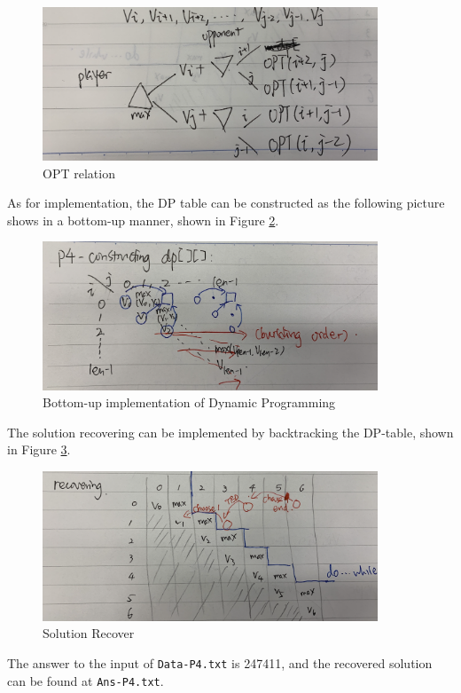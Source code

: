 \begin{exercise}[]
\begin{solution}
  \begin{figure}
    \centering
    \includegraphics[width=10cm]{img/ex4-1.png}
    \caption{OPT relation\label{fig:ex1}}
  \end{figure}


  As for implementation, the DP table can be constructed as the following picture shows in a bottom-up manner, shown in Figure \ref{fig:ex2}.
  
  \begin{figure}
    \centering
    \includegraphics[width=10cm]{img/ex4-2.png}
    \caption{Bottom-up implementation of Dynamic Programming\label{fig:ex2}}
  \end{figure}
  
  The solution recovering can be implemented by backtracking the DP-table, shown in Figure \ref{fig:ex3}.

  \begin{figure}
    \centering
    \includegraphics[width=10cm]{img/ex4-3.png}
    \caption{Solution Recover\label{fig:ex3}}
  \end{figure}

  The answer to the input of \texttt{Data-P4.txt} is 247411, and the recovered solution can be found at \texttt{Ans-P4.txt}.

  \end{solution}
  \label{ex4}
\end{exercise}